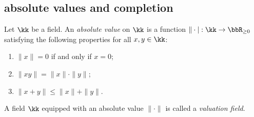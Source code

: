 



\subsection{absolute values and completion}

    \begin{definition}\label{def:valuation_field}
        Let \(\kk\) be a field.
        An \emph{absolute value} on \(\kk\) is a function \(\|\cdot|:\kk\to\bbR_{\ge0}\) satisfying the following properties for all \(x,y\in\kk\):
        \begin{enumerate}
            \item \(\|x\|=0\) if and only if \(x=0\);
            \item \(\|xy\|=\|x\|\cdot\|y\|\);
            \item \(\|x+y\|\leq\|x\|+\|y\|\).
        \end{enumerate}
        A field \(\kk\) equipped with an absolute value \(\|\cdot\|\) is called a \emph{valuation field}.
    \end{definition}

